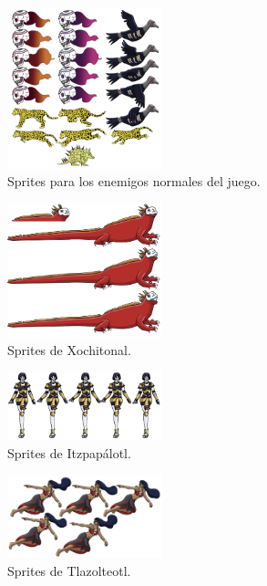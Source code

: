 \begin{figure}[h]
    \centering
    \includegraphics[width=0.40\textwidth]{Anexos/disenios/EnemigosNormales.png}
    \caption{Sprites para los enemigos normales del juego.}
    \label{fig:NorlmalEnemy}
\end{figure}

\begin{figure}[h]
    \centering
    \includegraphics[width=0.40\textwidth]{Anexos/disenios/Xochitonal.png}
    \caption{Sprites de Xochitonal.}
    \label{fig:Xochitonal}
\end{figure}

\begin{figure}[h]
    \centering
    \includegraphics[width=0.40\textwidth]{Anexos/disenios/Itzpapalotl.png}
    \caption{Sprites de Itzpapálotl.}
    \label{fig:Itzpapalotl}
\end{figure}

\begin{figure}[h]
    \centering
    \includegraphics[width=0.40\textwidth]{Anexos/disenios/Tlazolteotl.png}
    \caption{Sprites de Tlazolteotl.}
    \label{fig:Tlazolteotl}
\end{figure}

